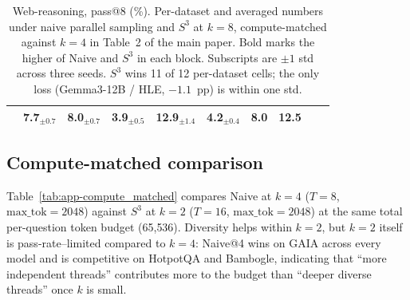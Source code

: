 \begin{table}[t]
\begin{tabular}{l *{6}{c} c *{2}{c}}
& \cellcolor{naivetint}7.7$_{\pm 0.7}$ & \cellcolor{s3tint}\textbf{8.0}$_{\pm 0.7}$
& \cellcolor{naivetint}3.9$_{\pm 0.5}$ & \cellcolor{s3tint}\textbf{12.9}$_{\pm 1.4}$
& 4.2$_{\pm 0.4}$
& \cellcolor{naivetint}8.0 & \cellcolor{s3tint}\textbf{12.5} \\
\bottomrule
\end{tabular}
\caption{Web-reasoning, pass@8 (\%). Per-dataset and averaged
numbers under naive parallel sampling and $S^3$ at $k{=}8$,
compute-matched against $k{=}4$ in Table~2 of the main paper.
Bold marks the higher of Naive and $S^3$ in each block.
Subscripts are $\pm 1$ std across three seeds.
$S^3$ wins 11 of 12 per-dataset cells; the only loss
(Gemma3-12B / HLE, $-1.1$~pp) is within one std.}
\label{tab:app-passk8-reasoning}
\end{table}

\subsection{Compute-matched comparison}
\label{app:compute_matched}

Table~\ref{tab:app-compute_matched} compares Naive at $k{=}4$
($T{=}8$, $\mathrm{max\_tok}{=}2048$) against $S^3$ at $k{=}2$
($T{=}16$, $\mathrm{max\_tok}{=}2048$) at the same total per-question
token budget (65{,}536). Diversity helps within $k{=}2$, but $k{=}2$
itself is pass-rate–limited compared to $k{=}4$: Naive@4 wins on
GAIA across every model and is competitive on HotpotQA and Bambogle,
indicating that ``more independent threads'' contributes more to the
budget than ``deeper diverse threads'' once $k$ is small.

